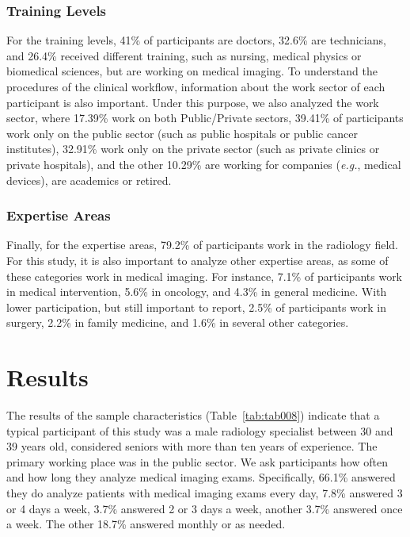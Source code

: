 \subsubsection{Training Levels}
\label{sec:chap004004002002}

For the training levels, 41\% of participants are doctors, 32.6\% are technicians, and 26.4\% received different training, such as nursing, medical physics or biomedical sciences, but are working on medical imaging.
To understand the procedures of the clinical workflow, information about the work sector of each participant is also important.
Under this purpose, we also analyzed the work sector, where 17.39\% work on both Public/Private sectors, 39.41\% of participants work only on the public sector (such as public hospitals or public cancer institutes), 32.91\% work only on the private sector (such as private clinics or private hospitals), and the other 10.29\% are working for companies ({\it e.g.}, medical devices), are academics or retired.

\subsubsection{Expertise Areas}
\label{sec:chap004004002003}

Finally, for the expertise areas, 79.2\% of participants work in the radiology field.
For this study, it is also important to analyze other expertise areas, as some of these categories work in medical imaging.
For instance, 7.1\% of participants work in medical intervention, 5.6\% in oncology, and 4.3\% in general medicine.
With lower participation, but still important to report, 2.5\% of participants work in surgery, 2.2\% in family medicine, and 1.6\% in several other categories.

\section{Results}
\label{sec:chap004005}

The results of the sample characteristics (Table~\ref{tab:tab008}) indicate that a typical participant of this study was a male radiology specialist between 30 and 39 years old, considered seniors with more than ten years of experience.
The primary working place was in the public sector.
We ask participants how often and how long they analyze medical imaging exams.
Specifically, 66.1\% answered they do analyze patients with medical imaging exams every day, 7.8\% answered 3 or 4 days a week, 3.7\% answered 2 or 3 days a week, another 3.7\% answered once a week. The other 18.7\% answered monthly or as needed.

